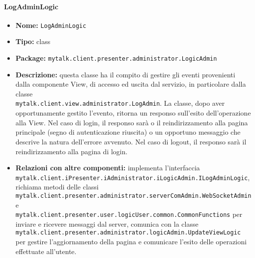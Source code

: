 \paragraph{LogAdminLogic}{
	\begin{itemize}
		\item [] \textbf{Nome:} \texttt{LogAdminLogic}
		\item [] \textbf{Tipo:} class
		\item [] \textbf{Package:} \texttt{mytalk.client.presenter.administrator.LogicAdmin}
		\item [] \textbf{Descrizione:}  questa classe ha il compito di gestire gli eventi provenienti dalla componente View, di accesso ed uscita dal servizio, in particolare dalla classe\\ \texttt{mytalk.client.view.administrator.LogAdmin}. La classe, dopo aver opportunamente gestito l'evento, ritorna un responso sull'esito dell'operazione alla View. Nel caso di login, il responso sarà o il reindirizzamento alla pagina principale (segno di autenticazione riuscita) o un opportuno messaggio che descrive la natura dell'errore avvenuto. Nel caso di logout, il responso sarà il reindirizzamento alla pagina di login.		
		\item [] \textbf{Relazioni con altre componenti:} implementa l'interfaccia\\ \texttt{mytalk.client.iPresenter.iAdministrator.iLogicAdmin.ILogAdminLogic}, richiama metodi delle classi \\
 \texttt{mytalk.client.presenter.administrator.serverComAdmin.WebSocketAdmin} e \\ \texttt{mytalk.client.presenter.user.logicUser.common.CommonFunctions} per inviare e ricevere messaggi dal server\g , comunica con la classe\\ \texttt{mytalk.client.presenter.administrator.logicAdmin.UpdateViewLogic}\\ per gestire l'aggiornamento della pagina e comunicare l'esito delle operazioni effettuate all'utente.
	\end{itemize}
}
